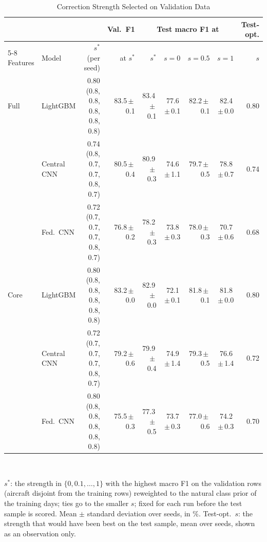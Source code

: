 \begin{table}[t]
\centering
\scriptsize
\caption{Correction Strength Selected on Validation Data}
\label{tab:selecteds}
\setlength{\tabcolsep}{3pt}
\begin{tabular}{llrrrrrrr}
\toprule
& & & Val.\ F1 & \multicolumn{4}{c}{Test macro F1 at} & Test-opt. \\
\cmidrule(lr){5-8}
Features & Model & $s^{*}$ (per seed) & at $s^{*}$ & $s^{*}$ & $s=0$ & $s=0.5$ & $s=1$ & $s$ \\
\midrule
Full & LightGBM & 0.80 (0.8, 0.8, 0.8, 0.8, 0.8) & 83.5{\,}$\pm${\,}0.1 & 83.4{\,}$\pm${\,}0.1 & 77.6{\,}$\pm${\,}0.1 & 82.2{\,}$\pm${\,}0.1 & 82.4{\,}$\pm${\,}0.0 & 0.80 \\
 & Central CNN & 0.74 (0.8, 0.7, 0.7, 0.8, 0.7) & 80.5{\,}$\pm${\,}0.4 & 80.9{\,}$\pm${\,}0.3 & 74.6{\,}$\pm${\,}1.1 & 79.7{\,}$\pm${\,}0.5 & 78.8{\,}$\pm${\,}0.7 & 0.74 \\
 & Fed.\ CNN & 0.72 (0.7, 0.7, 0.7, 0.8, 0.7) & 76.8{\,}$\pm${\,}0.2 & 78.2{\,}$\pm${\,}0.3 & 73.8{\,}$\pm${\,}0.3 & 78.0{\,}$\pm${\,}0.3 & 70.7{\,}$\pm${\,}0.6 & 0.68 \\
\midrule
Core & LightGBM & 0.80 (0.8, 0.8, 0.8, 0.8, 0.8) & 83.2{\,}$\pm${\,}0.0 & 82.9{\,}$\pm${\,}0.0 & 72.1{\,}$\pm${\,}0.1 & 81.8{\,}$\pm${\,}0.1 & 81.8{\,}$\pm${\,}0.0 & 0.80 \\
 & Central CNN & 0.72 (0.7, 0.7, 0.7, 0.8, 0.7) & 79.2{\,}$\pm${\,}0.6 & 79.9{\,}$\pm${\,}0.4 & 74.9{\,}$\pm${\,}1.4 & 79.3{\,}$\pm${\,}0.5 & 76.6{\,}$\pm${\,}1.4 & 0.72 \\
 & Fed.\ CNN & 0.80 (0.8, 0.8, 0.8, 0.8, 0.8) & 75.5{\,}$\pm${\,}0.3 & 77.3{\,}$\pm${\,}0.5 & 73.7{\,}$\pm${\,}0.3 & 77.0{\,}$\pm${\,}0.6 & 74.2{\,}$\pm${\,}0.3 & 0.70 \\
\bottomrule
\end{tabular}
\\[2pt]
\parbox{\linewidth}{\scriptsize $s^{*}$: the strength in $\{0,0.1,\dots,1\}$ with the highest macro F1 on the validation rows (aircraft disjoint from the training rows) reweighted to the natural class prior of the training days; ties go to the smaller $s$; fixed for each run before the test sample is scored. Mean $\pm$ standard deviation over seeds, in \%. Test-opt.\ $s$: the strength that would have been best on the test sample, mean over seeds, shown as an observation only.}
\end{table}
